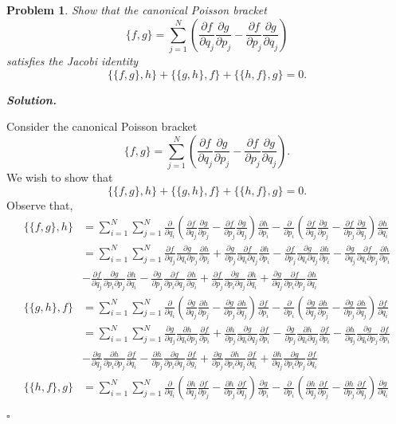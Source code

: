\documentclass[12pt]{report}
\newtheorem{problem}{Problem}
\newenvironment{solution}[1][\it{Solution}]{\textbf{#1. } }{$\square$}
\newcommand{\paren}[1]{{\left(#1\right)}} %
\newcommand{\pp}[2]{\frac{\partial #1}{\partial #2}} %
\begin{document}

\begin{problem}
    Show that the canonical Poisson bracket
$$\{f,g\}=\sum_{j=1}^N \left(\pp{f}{q_j}\pp{g}{p_j}-
\pp{f}{p_j}\pp{g}{q_j}\right)
$$
satisfies the Jacobi identity
$$
\{\{f,g\},h\}+\{\{g,h\},f\}+\{\{h,f\},g\}=0.
$$
\end{problem}

\begin{solution}

    \noindent
    Consider the canonical Poisson bracket
    \[
    \{f,g\}=\sum_{j=1}^N \left(\pp{f}{q_j}\pp{g}{p_j}-
    \pp{f}{p_j}\pp{g}{q_j}\right).
    \]
    We wish to show that
    \[
    \{\{f,g\},h\}+\{\{g,h\},f\}+\{\{h,f\},g\}=0.
    \]
    Observe that,
    \begin{align*}
        \{\{f,g\},h\} &=\sum_{i=1}^N\sum_{j=1}^N \pp{}{q_i}\paren{\pp{f}{q_j}\pp{g}{p_j} - \pp{f}{p_j}\pp{g}{q_j}}\pp{h}{p_i} - \pp{}{p_i}\paren{\pp{f}{q_j}\pp{g}{p_j} - \pp{f}{p_j}\pp{g}{q_j}}\pp{h}{q_i}\\
        &=\sum_{i=1}^N\sum_{j=1}^N \pp{f}{q_j}\pp{g}{q_i\partial p_j}\pp{h}{p_i} + \pp{g}{p_j}\pp{f}{q_i\partial q_j}\pp{h}{p_i} - \pp{f}{p_j}\pp{g}{q_i\partial q_j}\pp{h}{p_i}-\pp{g}{q_j}\pp{f}{q_i\partial p_j}\pp{h}{p_i}\\
        &-\pp{f}{q_j}\pp{g}{p_i\partial p_j}\pp{h}{q_i} - \pp{g}{p_j}\pp{f}{p_i \partial q_j}\pp{h}{g_i} + \pp{f}{p_j}\pp{g}{p_i\partial q_j}\pp{h}{q_i} + \pp{g}{q_j}\pp{f}{p_i \partial p_j}\pp{h}{q_i}\\
        \{\{g,h\},f\} &=\sum_{i=1}^N\sum_{j=1}^N \pp{}{q_i}\paren{\pp{g}{q_j}\pp{h}{p_j} - \pp{g}{p_j}\pp{h}{q_j}}\pp{f}{p_i} - \pp{}{p_i}\paren{\pp{g}{q_j}\pp{h}{p_j} - \pp{g}{p_j}\pp{h}{q_j}}\pp{f}{q_i}\\
        &=\sum_{i=1}^N\sum_{j=1}^N \pp{g}{q_j}\pp{h}{q_i\partial p_j}\pp{f}{p_i} + \pp{h}{p_j}\pp{g}{q_i\partial q_j}\pp{f}{p_i} - \pp{g}{p_j}\pp{h}{q_i\partial q_j}\pp{f}{p_i}-\pp{h}{q_j}\pp{g}{q_i\partial p_j}\pp{f}{p_i}\\
        &-\pp{g}{q_j}\pp{h}{p_i\partial p_j}\pp{f}{q_i} - \pp{h}{p_j}\pp{g}{p_i \partial q_j}\pp{f}{g_i} + \pp{g}{p_j}\pp{h}{p_i\partial q_j}\pp{f}{q_i} + \pp{h}{q_j}\pp{g}{p_i \partial p_j}\pp{f}{q_i}\\
        \{\{h,f\},g\} &=\sum_{i=1}^N\sum_{j=1}^N \pp{}{q_i}\paren{\pp{h}{q_j}\pp{f}{p_j} - \pp{h}{p_j}\pp{f}{q_j}}\pp{g}{p_i} - \pp{}{p_i}\paren{\pp{h}{q_j}\pp{f}{p_j} - \pp{h}{p_j}\pp{f}{q_j}}\pp{g}{q_i}\\

\end{align*}
\end{solution}
\end{document}
